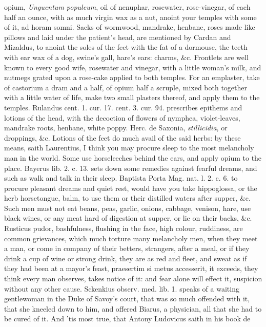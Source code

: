 opium, \emph{Unguentum populeum}, oil of nenuphar, rosewater, rose-vinegar,
of each half an ounce, with as much virgin wax as a nut, anoint your
temples with some of it, ad horam somni.
Sacks of wormwood, mandrake, henbane, roses made like
pillows and laid under the patient's head, are mentioned by
Cardan and Mizaldus, to anoint the soles of the feet with the fat
of a dormouse, the teeth with ear wax of a dog, swine's gall, hare's
ears: charms, \&c.
Frontlets are well known to every good wife, rosewater and vinegar,
with a little woman's milk, and nutmegs grated upon a rose-cake applied
to both temples.
For an emplaster, take of castorium a dram and a half, of opium half a
scruple, mixed both together with a little water of life, make two
small plasters thereof, and apply them to the temples.
Rulandus cent. 1. cur. 17. cent. 3. cur. 94. prescribes epithems and
lotions of the head, with the decoction of flowers of nymphea,
violet-leaves, mandrake roots, henbane, white poppy. Herc. de Saxonia,
\emph{stillicidia}, or droppings, \&c. Lotions of the feet do much avail of
the said herbs: by these means, saith Laurentius, I think you may
procure sleep to the most melancholy man in the world. Some use
horseleeches behind the ears, and apply opium to the place.
Bayerus lib. 2. c. 13. sets down some remedies against fearful
dreams, and such as walk and talk in their sleep. Baptista Porta Mag.
nat. l. 2. c. 6. to procure pleasant dreams and quiet rest, would have
you take hippoglossa, or the herb horsetongue, balm, to use them or
their distilled waters after supper, \&c. Such men must not eat beans,
peas, garlic, onions, cabbage, venison, hare, use black wines, or any
meat hard of digestion at supper, or lie on their backs, \&c.
Rusticus pudor, bashfulness, flushing in the face, high colour,
ruddiness, are common grievances, which much torture many melancholy
men, when they meet a man, or come in company of their betters,
strangers, after a meal, or if they drink a cup of wine or strong
drink, they are as red and fleet, and sweat as if they had been at a
mayor's feast, praesertim si metus accesserit, it exceeds, they
think every man observes, takes notice of it: and fear alone will
effect it, suspicion without any other cause. Sckenkius observ. med.
lib. 1. speaks of a waiting gentlewoman in the Duke of Savoy's court,
that was so much offended with it, that she kneeled down to him, and
offered Biarus, a physician, all that she had to be cured of it. And
'tis most true, that Antony Ludovicus saith in his book de
